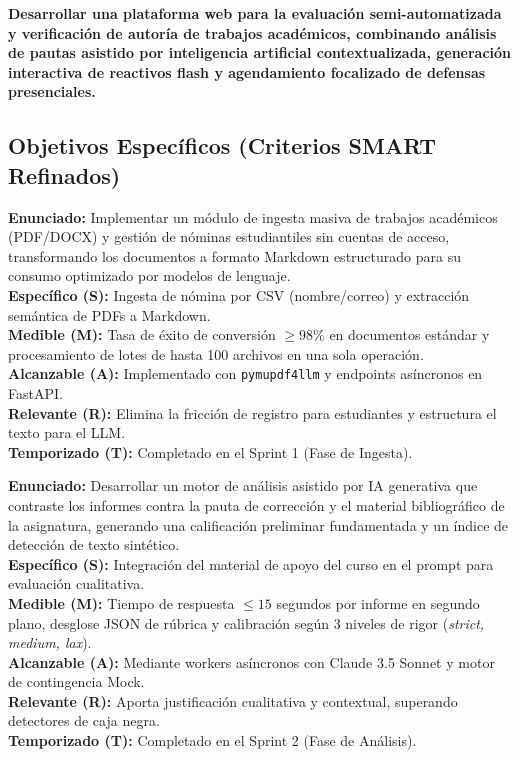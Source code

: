 \documentclass[11pt,a4paper]{article}
\begin{document}
\begin{tcolorbox}[colback=primary!5!white,colframe=primary,title=Objetivo General del Proyecto]
\large
\textbf{Desarrollar una plataforma web para la evaluación semi-automatizada y verificación de autoría de trabajos académicos, combinando análisis de pautas asistido por inteligencia artificial contextualizada, generación interactiva de reactivos flash y agendamiento focalizado de defensas presenciales.}
\end{tcolorbox}

\subsection{Objetivos Específicos (Criterios SMART Refinados)}

\begin{tcolorbox}[title=OE1: Ingesta, Nómina y Normalización Documental]
\textbf{Enunciado:} Implementar un módulo de ingesta masiva de trabajos académicos (PDF/DOCX) y gestión de nóminas estudiantiles sin cuentas de acceso, transformando los documentos a formato Markdown estructurado para su consumo optimizado por modelos de lenguaje.\\
\textbf{Específico (S):} Ingesta de nómina por CSV (nombre/correo) y extracción semántica de PDFs a Markdown.\\
\textbf{Medible (M):} Tasa de éxito de conversión $\ge 98\%$ en documentos estándar y procesamiento de lotes de hasta 100 archivos en una sola operación.\\
\textbf{Alcanzable (A):} Implementado con \texttt{pymupdf4llm} y endpoints asíncronos en FastAPI.\\
\textbf{Relevante (R):} Elimina la fricción de registro para estudiantes y estructura el texto para el LLM.\\
\textbf{Temporizado (T):} Completado en el Sprint 1 (Fase de Ingesta).
\end{tcolorbox}

\begin{tcolorbox}[title=OE2: Motor de Análisis Contextualizado y Detección de IA]
\textbf{Enunciado:} Desarrollar un motor de análisis asistido por IA generativa que contraste los informes contra la pauta de corrección y el material bibliográfico de la asignatura, generando una calificación preliminar fundamentada y un índice de detección de texto sintético.\\
\textbf{Específico (S):} Integración del material de apoyo del curso en el prompt para evaluación cualitativa.\\
\textbf{Medible (M):} Tiempo de respuesta $\le 15$ segundos por informe en segundo plano, desglose JSON de rúbrica y calibración según 3 niveles de rigor (\textit{strict, medium, lax}).\\
\textbf{Alcanzable (A):} Mediante workers asíncronos con Claude 3.5 Sonnet y motor de contingencia Mock.\\
\textbf{Relevante (R):} Aporta justificación cualitativa y contextual, superando detectores de caja negra.\\
\textbf{Temporizado (T):} Completado en el Sprint 2 (Fase de Análisis).
\end{tcolorbox}
\end{document}
